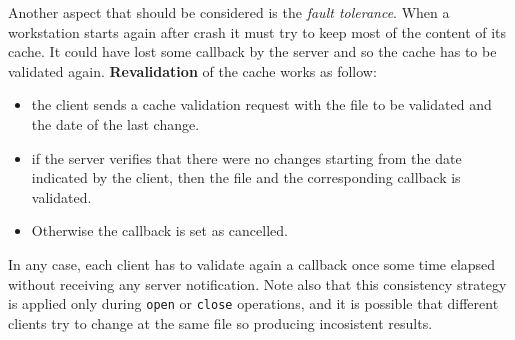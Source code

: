 Another aspect that should be considered is the \textit{fault tolerance}. When a workstation starts again after crash it must try to keep most of the content of its cache. It could have lost some callback by the server and so the cache has to be validated again. \textbf{Revalidation} of the cache works as follow:
\begin{itemize}
	\item the client sends a cache validation request with the file to be validated and the date of the last change.
	\item if the server verifies that there were no changes starting from the date indicated by the client, then the file and the corresponding callback is validated. 
	\item Otherwise the callback is set as cancelled. 
\end{itemize}
In any case, each client has to validate again a callback once some time elapsed without receiving any server notification. Note also that this consistency strategy is applied only during \verb|open| or \verb|close| operations, and it is possible that different clients try to change at the same file so producing incosistent results.